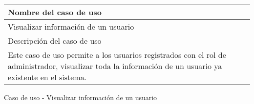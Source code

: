 \begin{identificacionCasoDeUso}
	\begin{tabular} { | p{17cm} |}

		\hline
		Nombre del caso de uso                                                                                                                                    \\ \hline
		Visualizar información de un usuario                                                                                                                      \\ \hline
		Descripción del caso de uso                                                                                                                               \\ \hline
		Este caso de uso permite a los usuarios registrados con el rol de administrador, visualizar toda la información de un usuario ya existente en el sistema. \\ \hline
	\end{tabular}
	\caption{Caso de uso - Visualizar información de un usuario}
\end{identificacionCasoDeUso}